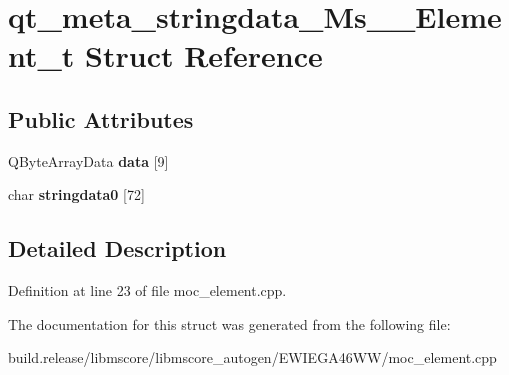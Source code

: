 \hypertarget{structqt__meta__stringdata___ms_____element__t}{}\section{qt\+\_\+meta\+\_\+stringdata\+\_\+\+Ms\+\_\+\+\_\+\+Element\+\_\+t Struct Reference}
\label{structqt__meta__stringdata___ms_____element__t}
\subsection*{Public Attributes}
\begin{DoxyCompactItemize}
\item 
\mbox{\label{structqt__meta__stringdata___ms_____element__t_a2fbf0b9f1fd9d50fff852dbdb08764df}} 
Q\+Byte\+Array\+Data {\bfseries data} \mbox{[}9\mbox{]}
\item 
\mbox{\label{structqt__meta__stringdata___ms_____element__t_ab3529fdcd4ddee4959ceb735720a8199}} 
char {\bfseries stringdata0} \mbox{[}72\mbox{]}
\end{DoxyCompactItemize}


\subsection{Detailed Description}


Definition at line 23 of file moc\+\_\+element.\+cpp.



The documentation for this struct was generated from the following file\+:\begin{DoxyCompactItemize}
\item 
build.\+release/libmscore/libmscore\+\_\+autogen/\+E\+W\+I\+E\+G\+A46\+W\+W/moc\+\_\+element.\+cpp\end{DoxyCompactItemize}
